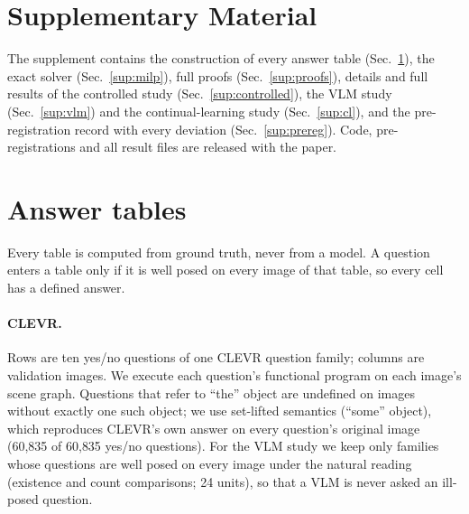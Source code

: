 
\appendix
\renewcommand{\thesection}{S\arabic{section}}
\renewcommand{\thetable}{S\arabic{table}}
\renewcommand{\thefigure}{S\arabic{figure}}
\setcounter{table}{0}\setcounter{figure}{0}

\section*{Supplementary Material}

\noindent
The supplement contains the construction of every answer table (Sec.~\ref{sup:tables}),
the exact solver (Sec.~\ref{sup:milp}), full proofs (Sec.~\ref{sup:proofs}), details and
full results of the controlled study (Sec.~\ref{sup:controlled}), the VLM study
(Sec.~\ref{sup:vlm}) and the continual-learning study (Sec.~\ref{sup:cl}), and the
pre-registration record with every deviation (Sec.~\ref{sup:prereg}). Code, pre-registrations
and all result files are released with the paper.

\section{Answer tables}
\label{sup:tables}

Every table is computed from ground truth, never from a model. A question enters a table only
if it is well posed on every image of that table, so every cell has a defined answer.

\paragraph{CLEVR.}
Rows are ten yes/no questions of one CLEVR question family; columns are validation images. We
execute each question's functional program on each image's scene graph. Questions that refer
to ``the'' object are undefined on images without exactly one such object; we use set-lifted
semantics (``some'' object), which reproduces CLEVR's own answer on every question's original
image (60{,}835 of 60{,}835 yes/no questions). For the VLM study we keep only families whose
questions are well posed on every image under the natural reading (existence and count
comparisons; 24 units), so that a VLM is never asked an ill-posed question.

